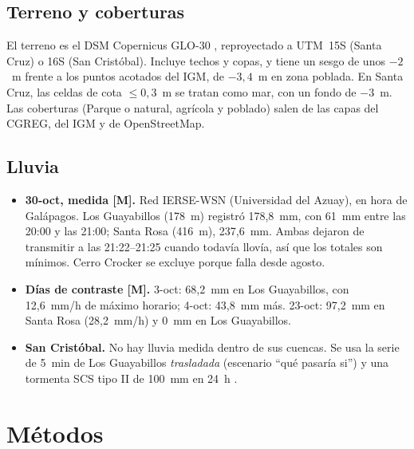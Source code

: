 \documentclass{sosg-informe}
\begin{document}
\subsection{Terreno y coberturas}
El terreno es el DSM Copernicus GLO-30 \citep{esa2021}, reproyectado a UTM~15S (Santa Cruz) o 16S (San Cristóbal). Incluye techos y copas, y tiene un sesgo de unos $-2$~m frente a los puntos acotados del IGM, de $-3,4$~m en zona poblada. En Santa Cruz, las celdas de cota $\leq 0,3$~m se tratan como mar, con un fondo de $-3$~m. Las coberturas (Parque o natural, agrícola y poblado) salen de las capas del CGREG, del IGM y de OpenStreetMap.

\subsection{Lluvia}
\begin{itemize}
  \item \textbf{30-oct, medida [M].} Red IERSE-WSN (Universidad del Azuay), en hora de Galápagos. Los Guayabillos (178~m) registró 178,8~mm, con 61~mm entre las 20:00 y las 21:00; Santa Rosa (416~m), 237,6~mm. Ambas dejaron de transmitir a las 21:22--21:25 cuando todavía llovía, así que los totales son mínimos. Cerro Crocker se excluye porque falla desde agosto.
  \item \textbf{Días de contraste [M].} 3-oct: 68,2~mm en Los Guayabillos, con 12,6~mm/h de máximo horario; 4-oct: 43,8~mm más. 23-oct: 97,2~mm en Santa Rosa (28,2~mm/h) y 0~mm en Los Guayabillos.
  \item \textbf{San Cristóbal.} No hay lluvia medida dentro de sus cuencas. Se usa la serie de 5~min de Los Guayabillos \emph{trasladada} (escenario \enquote{qué pasaría si}) y una tormenta SCS tipo II de 100~mm en 24~h \citep{usda1986}.
\end{itemize}

\section{Métodos}
\end{document}
